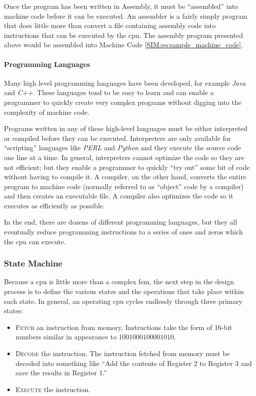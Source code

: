 Once the program has been written in Assembly, it must be ``assembled'' into machine code before it can be executed. An assembler is a fairly simply program that does little more than convert a file containing assembly code into instructions that can be executed by the \gls{cpu}. The assembly program presented above would be assembled into Machine Code \ref{SIM:eq:sample_machine_code}.

\paragraph{Programming Languages}

Many high level programming languages have been developed, for example \emph{Java} and \emph{C++}. These languages tend to be easy to learn and can enable a programmer to quickly create very complex programs without digging into the complexity of machine code.

Programs written in any of these high-level languages must be either interpreted or compiled before they can be executed. Interpreters are only available for ``scripting'' languages like \emph{PERL} and \emph{Python} and they execute the source code one line at a time. In general, interpreters cannot optimize the code so they are not efficient; but they enable a programmer to quickly ``try out'' some bit of code without having to compile it. A compiler, on the other hand, converts the entire program to machine code (normally referred to as ``object'' code by a compiler) and then creates an executable file. A compiler also optimizes the code so it executes as efficiently as possible.

In the end, there are dozens of different programming languages, but they all eventually reduce programming instructions to a series of ones and zeros which the \gls{cpu} can execute.

\subsubsection{State Machine}

Because a \gls{cpu} is little more than a complex \gls{fsm}, the next step in the design process is to define the various states and the operations that take place within each state. In general, an operating \gls{cpu} cycles endlessly through three primary states:

\begin{itemize}
  \item \textsc{Fetch} an instruction from memory. Instructions take the form of 16-bit numbers similar in appearance to $ 1001 0001 0000 1010 $.
  \item \textsc{Decode} the instruction. The instruction fetched from memory must be decoded into something like ``Add the contents of Register $ 2 $ to Register $ 3 $ and save the results in Register 1.''
  \item \textsc{Execute} the instruction.
\end{itemize}

